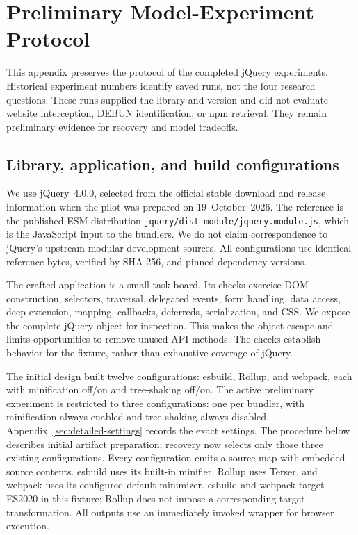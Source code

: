 \section{Preliminary Model-Experiment Protocol}
\label{sec:pilot-setup}
This appendix preserves the protocol of the completed jQuery experiments. Historical experiment numbers identify saved runs, not the four research questions. These runs supplied the library and version and did not evaluate website interception, DEBUN identification, or npm retrieval. They remain preliminary evidence for recovery and model tradeoffs.
\subsection{Library, application, and build configurations}
We use jQuery~4.0.0, selected from the official stable download and release information when the pilot was prepared on 19~October~2026. The reference is the published ESM distribution \nolinkurl{jquery/dist-module/jquery.module.js}, which is the JavaScript input to the bundlers. We do not claim correspondence to jQuery's upstream modular development sources. All configurations use identical reference bytes, verified by SHA-256, and pinned dependency versions.

The crafted application is a small task board. Its checks exercise DOM construction, selectors, traversal, delegated events, form handling, data access, deep extension, mapping, callbacks, deferreds, serialization, and CSS. We expose the complete jQuery object for inspection. This makes the object escape and limits opportunities to remove unused API methods. The checks establish behavior for the fixture, rather than exhaustive coverage of jQuery.

The initial design built twelve configurations: esbuild, Rollup, and webpack, each with minification off/on and tree-shaking off/on. The active preliminary experiment is restricted to three configurations: one per bundler, with minification always enabled and tree shaking always disabled. Appendix~\ref{sec:detailed-settings} records the exact settings. The procedure below describes initial artifact preparation; recovery now selects only those three existing configurations. Every configuration emits a source map with embedded source contents. esbuild uses its built-in minifier, Rollup uses Terser, and webpack uses its configured default minimizer. esbuild and webpack target ES2020 in this fixture; Rollup does not impose a corresponding target transformation. All outputs use an immediately invoked wrapper for browser execution.

